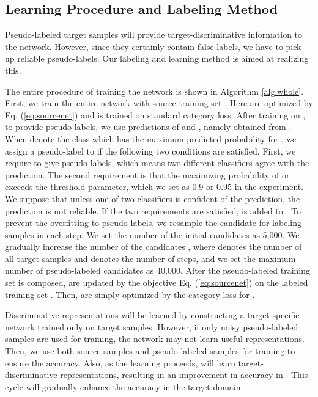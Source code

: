 \documentclass{article}
\begin{document}
\subsection{Learning Procedure and Labeling Method}
Pseudo-labeled target samples will provide target-discriminative information to the network. However, since they certainly contain false labels, we have to pick up reliable pseudo-labels. Our labeling and learning method is aimed at realizing this.

The entire procedure of training the network is shown in Algorithm \ref{alg:whole}. First, we train the entire network with source training set . Here  are optimized by Eq. (\ref{eq:sourcenet}) and  is trained on standard category loss.
After training on , to provide pseudo-labels, we use predictions of  and , namely  obtained from .
When  denote the class which has the maximum predicted probability for , we assign a pseudo-label to  if the following two conditions are satisfied. First, we require  to give pseudo-labels, which means two different classifiers agree with the prediction. The second requirement is that the maximizing probability of  or  exceeds the threshold parameter, which we set as 0.9 or 0.95 in the experiment. We suppose that unless one of two classifiers is confident of the prediction, the prediction is not reliable. If the two requirements are satisfied,  is added to .
To prevent the overfitting to pseudo-labels, we resample the candidate for labeling samples in each step. We set the number of the initial candidates  as 5,000. We gradually increase the number of the candidates , where  denotes the number of all target samples and  denotes the number of steps, and we set the maximum number of pseudo-labeled candidates as 40,000. After the pseudo-labeled training set  is composed,  are updated by the objective Eq. (\ref{eq:sourcenet}) on the labeled training set . Then,  are simply optimized by the category loss for .

Discriminative representations will be learned by constructing a target-specific network trained only on target samples. However, if only noisy pseudo-labeled samples are used for training, the network may not learn useful representations. Then, we use both source samples and pseudo-labeled samples for training  to ensure the accuracy.
Also, as the learning proceeds,  will learn target-discriminative representations, resulting in an improvement in accuracy in . This cycle will gradually enhance the accuracy in the target domain.
\end{document}
